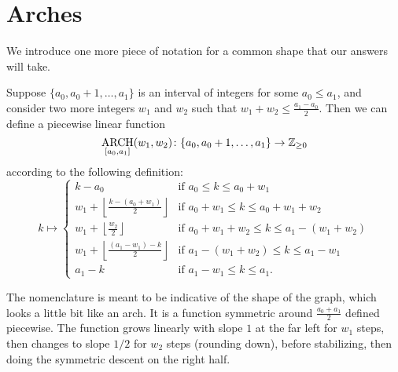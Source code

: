 
\section{Arches}
We introduce one more piece of notation for a common shape that our answers will take.

\begin{definition}
  Suppose $\{a_0, a_0 + 1, \dots, a_1\}$ is an interval of integers for some $a_0 \le a_1$,
  and consider two more integers $w_1$ and $w_2$ such that $w_1 + w_2 \le \frac{a_1-a_0}{2}$.
  Then we can define a piecewise linear function
  \[ \operatorname*{ARCH}_{[a_0, a_1]}(w_1, w_2) \colon \{a_0, a_0+1, \dots, a_1\} \to \mathbb Z_{\ge 0} \]
  according to the following definition:
  \[
    k \mapsto
    \begin{cases}
      k - a_0 & \text{if }a_0 \le k \le a_0 + w_1 \\
      w_1 + \left\lfloor \frac{k-(a_0+w_1)}{2} \right\rfloor & \text{if } a_0 + w_1 \le k \le a_0 + w_1 + w_2 \\
      w_1 + \left\lfloor \frac{w_2}{2} \right\rfloor & \text{if } a_0 + w_1 + w_2 \le k \le a_1 - (w_1 + w_2)\\
      w_1 + \left\lfloor \frac{(a_1-w_1) - k}{2} \right\rfloor & \text{if } a_1 - (w_1 + w_2) \le k \le a_1 - w_1 \\
      a_1 - k & \text{if }a_1 - w_1 \le k \le a_1.
    \end{cases}
  \]
\end{definition}
The nomenclature is meant to be indicative of the shape of the graph,
which looks a little bit like an arch.
It is a function symmetric around $\frac{a_0+a_1}{2}$ defined piecewise.
The function grows linearly with slope $1$ at the far left for $w_1$ steps,
then changes to slope $1/2$ for $w_2$ steps (rounding down),
before stabilizing, then doing the symmetric descent on the right half.
